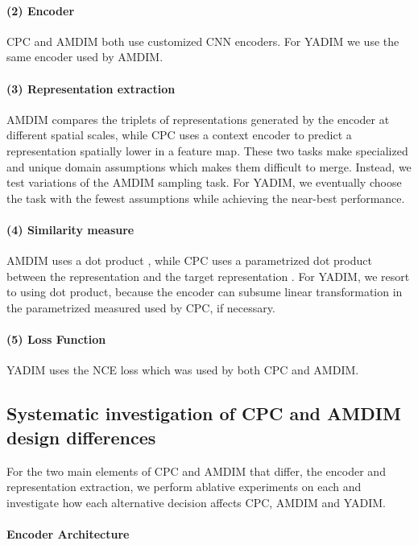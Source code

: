\documentclass{article}
\begin{document}
\paragraph{(2) Encoder}

CPC and AMDIM both use customized CNN encoders. For YADIM we use the same encoder used by AMDIM.

\paragraph{(3) Representation extraction}

AMDIM compares the triplets of representations generated by the encoder at different spatial scales, while CPC uses a context encoder to predict a representation spatially lower in a feature map. These two tasks make specialized and unique domain assumptions which makes them difficult to merge. Instead, we test variations of the AMDIM sampling task. For YADIM, we eventually choose the task with the fewest assumptions while achieving the near-best performance.

\paragraph{(4) Similarity measure}

AMDIM uses a dot product , while CPC uses a parametrized dot product between the representation  and the target representation . For YADIM, we resort to using dot product, because the encoder can subsume linear transformation in the parametrized measured used by CPC, if necessary.

\paragraph{(5) Loss Function}

YADIM uses the NCE loss which was used by both CPC and AMDIM.

\subsection{Systematic investigation of CPC and AMDIM design differences}

For the two main elements of CPC and AMDIM that differ, the encoder and representation extraction, we perform ablative experiments on each and investigate how each alternative decision affects CPC, AMDIM and YADIM.

\paragraph{Encoder Architecture}
\end{document}
